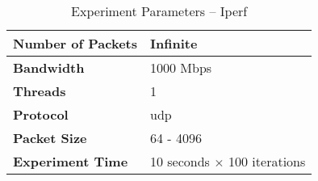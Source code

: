 \begin{table}[ht!]
    \small
    \caption{Experiment Parameters -- Iperf}
    \label{iperfparam}
    \begin{adjustbox}{center}
        \renewcommand*\arraystretch{1.2}\begin{tabular}{| L{3.5cm} || L{4.5cm} |}
            \hline
            \textbf{Number of Packets} & Infinite
            \\ \hline
            \textbf{Bandwidth} & 1000 Mbps
            \\ \hline
            \textbf{Threads} & 1
            \\ \hline
            \textbf{Protocol} & \gls{udp}
            \\ \hline
            \textbf{Packet Size} & 64 - 4096
            \\ \hline
            \textbf{Experiment Time} & 10 seconds $\times$ 100 iterations
            \\ \hline
        \end{tabular}
    \end{adjustbox}
\end{table}
